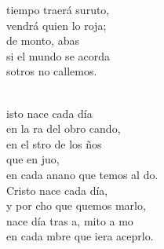 \documentclass[12pt]{article}
\begin{document}
\begin{multicols*}{2}
\begin{cancion}
	 tiempo traerá suruto,\\
	 vendrá quien lo roja;\\
	de monto, abas\\
	si el mundo se acorda\\
	sotros no callemos.\\\jump\\
	\begin{chorus}%
	isto nace cada día\\
	en la ra del obro cando,\\
	en el stro de los ños\\
	que en juo, \\
	en cada anano que temos al do.\\
Cristo nace cada día,\\
	y por cho que quemos marlo,\\
	nace día tras a, mito a mo  \\
	en cada mbre que iera aceprlo.\\
	\end{chorus}%
	\jump\\
\end{cancion}%


\end{multicols*}
\end{document}
